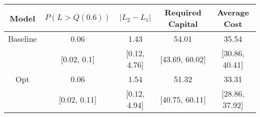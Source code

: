 \begin{tabular}{ccccc}
\toprule
   Model & $P(L > Q(0.6))$ & $|L_2 - L_1|$ & Required Capital &   Average Cost \\
\midrule
Baseline &            0.06 &          1.43 &            54.01 &          35.54 \\
         &     [0.02, 0.1] &  [0.12, 4.76] &   [43.69, 60.02] & [30.86, 40.41] \\
     Opt &            0.06 &          1.54 &            51.32 &          33.31 \\
         &    [0.02, 0.11] &  [0.12, 4.94] &   [40.75, 60.11] & [28.86, 37.92] \\
\bottomrule
\end{tabular}
